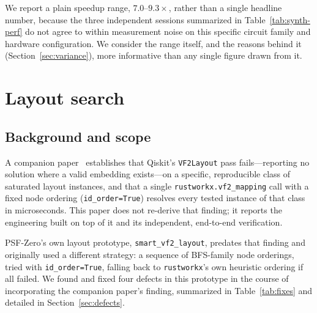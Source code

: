 \documentclass[11pt]{article}
\begin{document}
We report a plain speedup range, $7.0$--$9.3\times$, rather than a
single headline number, because the three independent sessions
summarized in Table~\ref{tab:synth-perf} do not agree to within
measurement noise on this specific circuit family and hardware
configuration. We consider the range itself, and the reasons behind
it (Section~\ref{sec:variance}), more informative than any single
figure drawn from it.

\section{Layout search}
\label{sec:layout}

\subsection{Background and scope}

A companion paper~\cite{vf2cliff} establishes that Qiskit's
\texttt{VF2Layout} pass fails---reporting no solution where a valid
embedding exists---on a specific, reproducible class of saturated
layout instances, and that a single \texttt{rustworkx.vf2\_mapping}
call with a fixed node ordering (\texttt{id\_order=True}) resolves
every tested instance of that class in microseconds. This paper does
not re-derive that finding; it reports the engineering built on top of
it and its independent, end-to-end verification.

PSF-Zero's own layout prototype, \texttt{smart\_vf2\_layout}, predates
that finding and originally used a different strategy: a sequence of
BFS-family node orderings, tried with \texttt{id\_order=True}, falling
back to \texttt{rustworkx}'s own heuristic ordering if all failed. We
found and fixed four defects in this prototype in the course of
incorporating the companion paper's finding, summarized in
Table~\ref{tab:fixes} and detailed in Section~\ref{sec:defects}.
\end{document}
